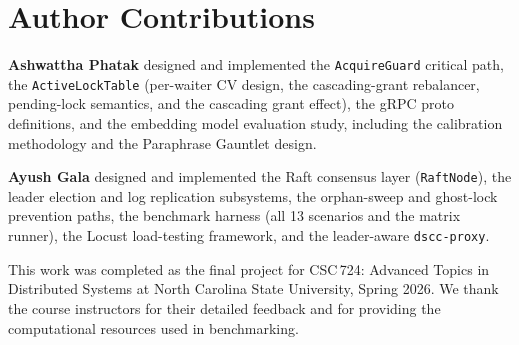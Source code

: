\documentclass[sigconf]{acmart}
\begin{document}
\section*{Author Contributions}

\textbf{Ashwattha Phatak} designed and implemented the
\texttt{AcquireGuard} critical path, the \texttt{ActiveLockTable}
(per-waiter CV design, the cascading-grant rebalancer, pending-lock
semantics, and the cascading grant effect), the gRPC proto
definitions, and the embedding model evaluation study, including the
calibration methodology and the Paraphrase Gauntlet design.

\textbf{Ayush Gala} designed and implemented the Raft consensus layer
(\texttt{RaftNode}), the leader election and log replication
subsystems, the orphan-sweep and ghost-lock prevention paths, the
benchmark harness (all 13 scenarios and the matrix runner), the
Locust load-testing framework, and the leader-aware
\texttt{dscc-proxy}.

\begin{acks}
This work was completed as the final project for CSC\,724: Advanced
Topics in Distributed Systems at North Carolina State University,
Spring 2026. We thank the course instructors for their detailed
feedback and for providing the computational resources used in
benchmarking.
\end{acks}

% 




\end{document}
